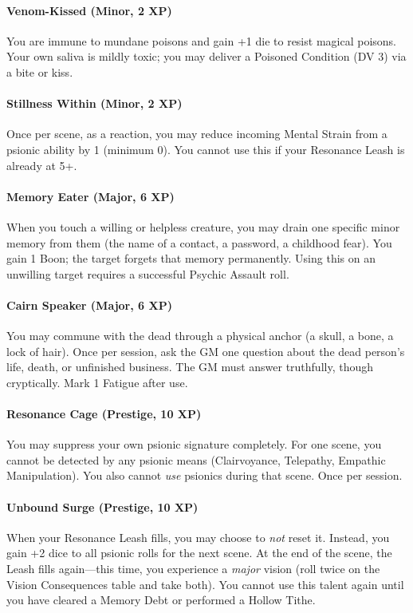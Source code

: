 \documentclass[11pt]{article}
\begin{document}
\paragraph{Venom-Kissed (Minor, 2 XP)} You are immune to mundane poisons and gain +1 die to resist magical poisons. Your own saliva is mildly toxic; you may deliver a Poisoned Condition (DV 3) via a bite or kiss.

\paragraph{Stillness Within (Minor, 2 XP)} Once per scene, as a reaction, you may reduce incoming Mental Strain from a psionic ability by 1 (minimum 0). You cannot use this if your Resonance Leash is already at 5+.

\paragraph{Memory Eater (Major, 6 XP)} When you touch a willing or helpless creature, you may drain one specific minor memory from them (the name of a contact, a password, a childhood fear). You gain 1 Boon; the target forgets that memory permanently. Using this on an unwilling target requires a successful Psychic Assault roll.

\paragraph{Cairn Speaker (Major, 6 XP)} You may commune with the dead through a physical anchor (a skull, a bone, a lock of hair). Once per session, ask the GM one question about the dead person's life, death, or unfinished business. The GM must answer truthfully, though cryptically. Mark 1 Fatigue after use.

\paragraph{Resonance Cage (Prestige, 10 XP)} You may suppress your own psionic signature completely. For one scene, you cannot be detected by any psionic means (Clairvoyance, Telepathy, Empathic Manipulation). You also cannot \textit{use} psionics during that scene. Once per session.

\paragraph{Unbound Surge (Prestige, 10 XP)} When your Resonance Leash fills, you may choose to \textit{not} reset it. Instead, you gain +2 dice to all psionic rolls for the next scene. At the end of the scene, the Leash fills again---this time, you experience a \textit{major} vision (roll twice on the Vision Consequences table and take both). You cannot use this talent again until you have cleared a Memory Debt or performed a Hollow Tithe.
\end{document}
